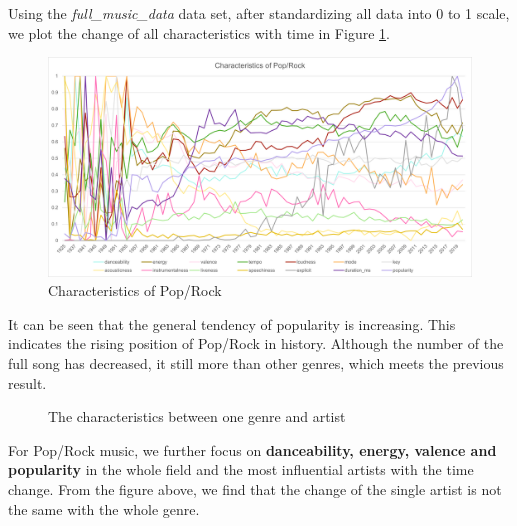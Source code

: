 \documentclass[12pt]{article}
\begin{document}
Using the \emph{full\_music\_data} data set, after standardizing all data into 0 to 1 scale, we plot the change of all characteristics with time in Figure \ref{Pop}.
\begin{figure}[H]
\label{fig:aa}
\small
\centering
\includegraphics[width=12cm]{figures/Q3_POP.png}
\caption{Characteristics of Pop/Rock}
\label{Pop} 
\end{figure}

It can be seen that the general tendency of popularity is increasing. This indicates the rising position of Pop/Rock in history. Although the number of the full song has decreased, it still more than other genres, which meets the previous result.
\begin{figure}[H]
\centering
{}
\caption{The characteristics between one genre and artist}
\label{characteristics}
\end{figure}

For Pop/Rock music, we further focus on \textbf{danceability, energy, valence and popularity} in the whole field and the most influential artists with the time change. From the figure above, we find that the change of the single artist is not the same with the whole genre. 
\end{document}
